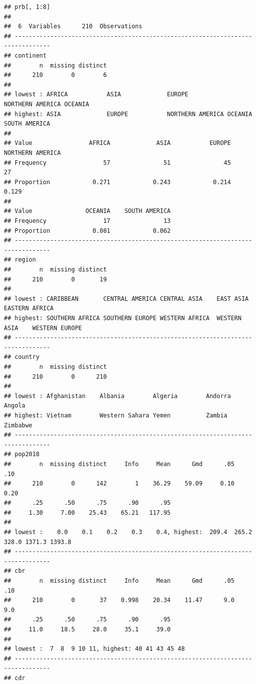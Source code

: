 \documentclass[
]{article}
\begin{document}
\begin{verbatim}
## prb[, 1:8] 
## 
##  6  Variables      210  Observations
## --------------------------------------------------------------------------------
## continent 
##        n  missing distinct 
##      210        0        6 
## 
## lowest : AFRICA           ASIA             EUROPE           NORTHERN AMERICA OCEANIA         
## highest: ASIA             EUROPE           NORTHERN AMERICA OCEANIA          SOUTH AMERICA   
##                                                                               
## Value                AFRICA             ASIA           EUROPE NORTHERN AMERICA
## Frequency                57               51               45               27
## Proportion            0.271            0.243            0.214            0.129
##                                             
## Value               OCEANIA    SOUTH AMERICA
## Frequency                17               13
## Proportion            0.081            0.062
## --------------------------------------------------------------------------------
## region 
##        n  missing distinct 
##      210        0       19 
## 
## lowest : CARIBBEAN       CENTRAL AMERICA CENTRAL ASIA    EAST ASIA       EASTERN AFRICA 
## highest: SOUTHERN AFRICA SOUTHERN EUROPE WESTERN AFRICA  WESTERN ASIA    WESTERN EUROPE 
## --------------------------------------------------------------------------------
## country 
##        n  missing distinct 
##      210        0      210 
## 
## lowest : Afghanistan    Albania        Algeria        Andorra        Angola        
## highest: Vietnam        Western Sahara Yemen          Zambia         Zimbabwe      
## --------------------------------------------------------------------------------
## pop2018 
##        n  missing distinct     Info     Mean      Gmd      .05      .10 
##      210        0      142        1    36.29    59.09     0.10     0.20 
##      .25      .50      .75      .90      .95 
##     1.30     7.00    25.43    65.21   117.95 
## 
## lowest :    0.0    0.1    0.2    0.3    0.4, highest:  209.4  265.2  328.0 1371.3 1393.8
## --------------------------------------------------------------------------------
## cbr 
##        n  missing distinct     Info     Mean      Gmd      .05      .10 
##      210        0       37    0.998    20.34    11.47      9.0      9.0 
##      .25      .50      .75      .90      .95 
##     11.0     18.5     28.0     35.1     39.0 
## 
## lowest :  7  8  9 10 11, highest: 40 41 43 45 48
## --------------------------------------------------------------------------------
## cdr 

\end{verbatim}
\end{document}
